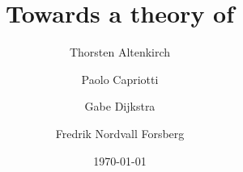 \documentclass{beamer}
\title[Towards a theory of HITs]{Towards a theory of \hits}
\author[]{
  Thorsten Altenkirch\inst{1}
\and
  Paolo Capriotti\inst{1}
\and
  Gabe Dijkstra\inst{1}\\
\and
  Fredrik Nordvall Forsberg\inst{2}
}
\institute[]{
  Nottingham University
\and
  University of Strathclyde
 }
\date{\today}
\begin{document}
\begin{frame}
\maketitle
\end{frame}
\end{document}
